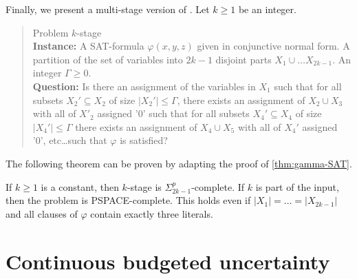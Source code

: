 Finally, we present a multi-stage version of {\radj}. Let $k \geq 1$ be an integer.

\begin{quote}
Problem $k$-stage {\radj}
\\
\textbf{Instance:}  A SAT-formula $\varphi(x,y,z)$ given in conjunctive normal form. A partition of the set of variables into $2k-1$ disjoint parts $X_1 \cup \dots X_{2k-1}$. An integer $\Gamma \geq 0$.  
\\
\textbf{Question:} Is there an assignment of the variables in $X_1$ such that for all subsets $X_2' \subseteq X_2$ of size $|X_2'| \leq \Gamma$, there exists an assignment of $X_2 \cup X_3$ with all of $X'_2$ assigned '0' such that for all subsets $X_4' \subseteq X_4$ of size $|X_4'| \leq \Gamma$ there exists an assignment of $X_4 \cup X_5$ with all of $X_4'$ assigned '0', etc\dots such that $\varphi$ is satisfied?
\end{quote}

The following theorem can be proven by adapting the proof of \cref{thm:gamma-SAT}. 

\begin{theorem}
\label{thm:multi-stage-gamma-sat}
If $k \geq 1$ is a constant, then $k$-stage {\radj} is $\Sigma_{2k-1}^p$-complete. If $k$ is part of the input, then the problem is PSPACE-complete. This holds even if $|X_1|=\dots=|X_{2k-1}|$ and all clauses of $\varphi$ contain exactly three literals.
\end{theorem}


\section{Continuous budgeted uncertainty}
\label{sec:contbudgeted}

